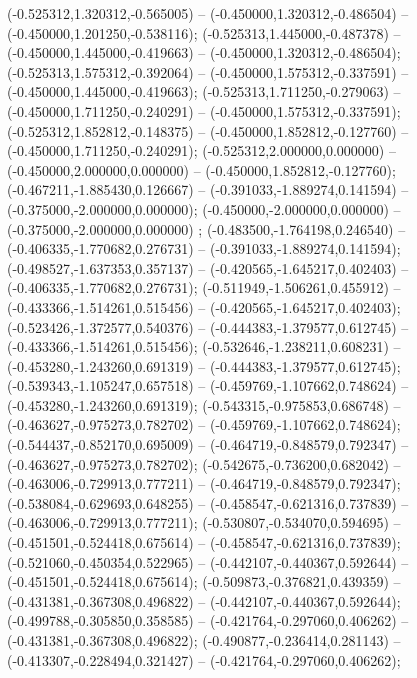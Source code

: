  (-0.525312,1.320312,-0.565005) -- (-0.450000,1.320312,-0.486504) -- (-0.450000,1.201250,-0.538116);
 (-0.525313,1.445000,-0.487378) -- (-0.450000,1.445000,-0.419663) -- (-0.450000,1.320312,-0.486504);
 (-0.525313,1.575312,-0.392064) -- (-0.450000,1.575312,-0.337591) -- (-0.450000,1.445000,-0.419663);
 (-0.525313,1.711250,-0.279063) -- (-0.450000,1.711250,-0.240291) -- (-0.450000,1.575312,-0.337591);
 (-0.525312,1.852812,-0.148375) -- (-0.450000,1.852812,-0.127760) -- (-0.450000,1.711250,-0.240291);
 (-0.525312,2.000000,0.000000) -- (-0.450000,2.000000,0.000000) -- (-0.450000,1.852812,-0.127760);
 (-0.467211,-1.885430,0.126667) -- (-0.391033,-1.889274,0.141594) -- (-0.375000,-2.000000,0.000000);
 (-0.450000,-2.000000,0.000000) -- (-0.375000,-2.000000,0.000000) ;
 (-0.483500,-1.764198,0.246540) -- (-0.406335,-1.770682,0.276731) -- (-0.391033,-1.889274,0.141594);
 (-0.498527,-1.637353,0.357137) -- (-0.420565,-1.645217,0.402403) -- (-0.406335,-1.770682,0.276731);
 (-0.511949,-1.506261,0.455912) -- (-0.433366,-1.514261,0.515456) -- (-0.420565,-1.645217,0.402403);
 (-0.523426,-1.372577,0.540376) -- (-0.444383,-1.379577,0.612745) -- (-0.433366,-1.514261,0.515456);
 (-0.532646,-1.238211,0.608231) -- (-0.453280,-1.243260,0.691319) -- (-0.444383,-1.379577,0.612745);
 (-0.539343,-1.105247,0.657518) -- (-0.459769,-1.107662,0.748624) -- (-0.453280,-1.243260,0.691319);
 (-0.543315,-0.975853,0.686748) -- (-0.463627,-0.975273,0.782702) -- (-0.459769,-1.107662,0.748624);
 (-0.544437,-0.852170,0.695009) -- (-0.464719,-0.848579,0.792347) -- (-0.463627,-0.975273,0.782702);
 (-0.542675,-0.736200,0.682042) -- (-0.463006,-0.729913,0.777211) -- (-0.464719,-0.848579,0.792347);
 (-0.538084,-0.629693,0.648255) -- (-0.458547,-0.621316,0.737839) -- (-0.463006,-0.729913,0.777211);
 (-0.530807,-0.534070,0.594695) -- (-0.451501,-0.524418,0.675614) -- (-0.458547,-0.621316,0.737839);
 (-0.521060,-0.450354,0.522965) -- (-0.442107,-0.440367,0.592644) -- (-0.451501,-0.524418,0.675614);
 (-0.509873,-0.376821,0.439359) -- (-0.431381,-0.367308,0.496822) -- (-0.442107,-0.440367,0.592644);
 (-0.499788,-0.305850,0.358585) -- (-0.421764,-0.297060,0.406262) -- (-0.431381,-0.367308,0.496822);
 (-0.490877,-0.236414,0.281143) -- (-0.413307,-0.228494,0.321427) -- (-0.421764,-0.297060,0.406262);
